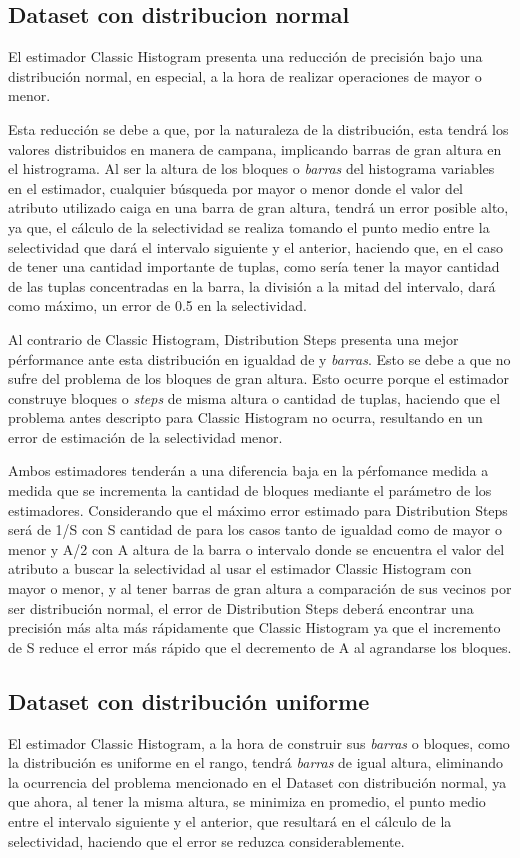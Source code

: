 \documentclass[a4paper, 10pt, twoside]{article}
\begin{document}
\subsection{Dataset con distribucion normal}
El estimador Classic Histogram presenta una reducción de precisión bajo una distribución normal, en especial, a la hora de realizar operaciones de mayor o menor.

Esta reducción se debe a que, por la naturaleza de la distribución, esta tendrá los valores distribuidos en manera de campana, implicando 
barras de gran altura en el histrograma. Al ser la altura de los bloques o \textit{barras} del histograma variables en el estimador, 
cualquier búsqueda por mayor o menor donde el valor del atributo utilizado caiga en una barra de gran altura, 
tendrá un error posible alto, ya que, el cálculo de la selectividad se realiza tomando el punto medio entre la selectividad que dará el 
intervalo siguiente y el anterior, haciendo que, en el caso de tener una cantidad importante de tuplas, como sería tener la mayor cantidad de las tuplas concentradas en la barra, la división a la mitad del intervalo, dará como máximo, un error de 0.5 en la selectividad.

Al contrario de Classic Histogram, Distribution Steps presenta una mejor pérformance ante esta distribución en igualdad de  y \textit{barras}. Esto se debe a que no sufre del problema de los bloques de gran altura. Esto ocurre porque el estimador construye bloques o \textit{steps} de misma altura o cantidad de tuplas, haciendo que el problema antes descripto para Classic Histogram no ocurra, resultando en un error de estimación de la selectividad menor.

Ambos estimadores tenderán a una diferencia baja en la pérfomance medida a medida que se incrementa la cantidad de bloques mediante el parámetro de los estimadores. Considerando que el máximo error estimado para Distribution Steps será de 1/S con S cantidad de  para los casos tanto de igualdad como de mayor o menor y A/2 con A altura de la barra o intervalo donde se encuentra el valor del atributo a buscar la selectividad al usar el estimador Classic Histogram con mayor o menor, y al tener barras de gran altura a comparación de sus vecinos por ser distribución normal, el error de Distribution Steps deberá encontrar una precisión más alta más rápidamente que Classic Histogram ya que el incremento de S reduce el error más rápido que el decremento de A al agrandarse los bloques.

\subsection{Dataset con distribución uniforme}
El estimador Classic Histogram, a la hora de construir sus \textit{barras} o bloques, como la distribución es uniforme en el rango, tendrá \textit{barras} de igual altura, eliminando la ocurrencia del problema mencionado en el Dataset con distribución normal, ya que ahora, al tener la misma altura, se minimiza en promedio, el punto medio entre el intervalo siguiente y el anterior, que resultará en el cálculo de la selectividad, haciendo que el error se reduzca considerablemente.
\end{document}
